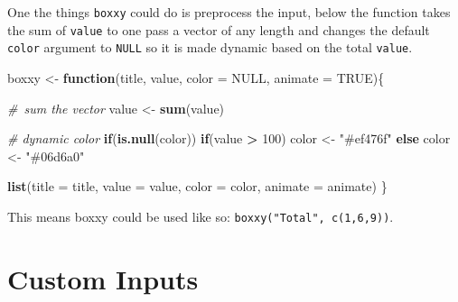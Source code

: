 \documentclass[
]{krantz}
\makeatletter
\newenvironment{Shaded}{\begin{snugshade}}{\end{snugshade}}
\newcommand{\CommentTok}[1]{\textcolor[rgb]{0.37,0.37,0.37}{\textit{#1}}}
\newcommand{\ControlFlowTok}[1]{\textcolor[rgb]{0.27,0.27,0.27}{\textbf{#1}}}
\newcommand{\DataTypeTok}[1]{\textcolor[rgb]{0.27,0.27,0.27}{#1}}
\newcommand{\DecValTok}[1]{\textcolor[rgb]{0.06,0.06,0.06}{#1}}
\newcommand{\KeywordTok}[1]{\textcolor[rgb]{0.27,0.27,0.27}{\textbf{#1}}}
\newcommand{\NormalTok}[1]{#1}
\newcommand{\OperatorTok}[1]{\textcolor[rgb]{0.43,0.43,0.43}{\textbf{#1}}}
\newcommand{\OtherTok}[1]{\textcolor[rgb]{0.37,0.37,0.37}{#1}}
\newcommand{\StringTok}[1]{\textcolor[rgb]{0.5,0.5,0.5}{#1}}
\newenvironment{kframe}{%
\medskip{}
\setlength{\fboxsep}{.8em}
 \def\at@end@of@kframe{}%
 \ifinner\ifhmode%
  \def\at@end@of@kframe{\end{minipage}}%
  \begin{minipage}{\columnwidth}%
 \fi\fi%
 \def\FrameCommand##1{\hskip\@totalleftmargin \hskip-\fboxsep
 \colorbox{shadecolor}{##1}\hskip-\fboxsep
     \hskip-\linewidth \hskip-\@totalleftmargin \hskip\columnwidth}%
 \MakeFramed {\advance\hsize-\width
   \@totalleftmargin\z@ \linewidth\hsize
   \@setminipage}}%
 {\par\unskip\endMakeFramed%
 \at@end@of@kframe}
\renewenvironment{Shaded}{\begin{kframe}}{\end{kframe}}
\makeatother
\begin{document}
\begin{Shaded}
\end{Shaded}

One the things \texttt{boxxy} could do is preprocess the input, below the function takes the sum of \texttt{value} to one pass a vector of any length and changes the default \texttt{color} argument to \texttt{NULL} so it is made dynamic based on the total \texttt{value}.

\begin{Shaded}
\begin{Highlighting}[]
\NormalTok{boxxy \textless{}{-}}\StringTok{ }\ControlFlowTok{function}\NormalTok{(title, value, }\DataTypeTok{color =} \OtherTok{NULL}\NormalTok{, }\DataTypeTok{animate =} \OtherTok{TRUE}\NormalTok{)\{}

  \CommentTok{\# sum the vector}
\NormalTok{  value \textless{}{-}}\StringTok{ }\KeywordTok{sum}\NormalTok{(value)}

  \CommentTok{\# dynamic color}
  \ControlFlowTok{if}\NormalTok{(}\KeywordTok{is.null}\NormalTok{(color))}
    \ControlFlowTok{if}\NormalTok{(value }\OperatorTok{\textgreater{}}\StringTok{ }\DecValTok{100}\NormalTok{)}
\NormalTok{      color \textless{}{-}}\StringTok{ "\#ef476f"}
    \ControlFlowTok{else}
\NormalTok{      color \textless{}{-}}\StringTok{ "\#06d6a0"}

  \KeywordTok{list}\NormalTok{(}\DataTypeTok{title =}\NormalTok{ title, }\DataTypeTok{value =}\NormalTok{ value, }\DataTypeTok{color =}\NormalTok{ color, }\DataTypeTok{animate =}\NormalTok{ animate)}
\NormalTok{\}}
\end{Highlighting}
\end{Shaded}

This means boxxy could be used like so: \texttt{boxxy("Total",\ c(1,6,9))}.

\hypertarget{shiny-input}{%
\chapter{Custom Inputs}\label{shiny-input}}
\end{document}
